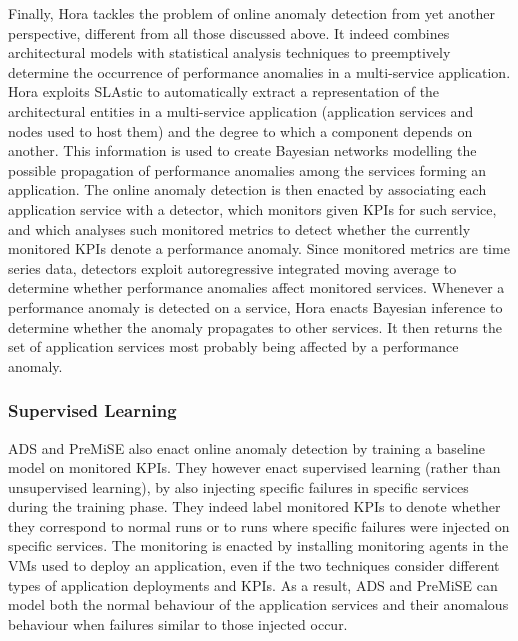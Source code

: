 Finally, Hora \cite{27_Pitakrat2018_HoraExtended,28_Pitakrat2016_Hora} tackles the problem of online anomaly detection from yet another perspective, different from all those discussed above.
It indeed combines architectural models with statistical analysis techniques to preemptively determine the occurrence of performance anomalies in a multi-service application. 
Hora exploits SLAstic \cite{vanHoorn2014_SLAstic} to automatically extract a representation of the architectural entities in a multi-service application (\viz application services and nodes used to host them) and the degree to which a component depends on another.
This information is used to create Bayesian networks \cite{Neal1996_BayesianNetwork} modelling the possible propagation of performance anomalies among the services forming an application.
The online anomaly detection is then enacted by associating each application service with a detector, which monitors given KPIs for such service, and which analyses such monitored metrics to detect whether the currently monitored KPIs denote a performance anomaly. 
Since monitored metrics are time series data, detectors exploit autoregressive integrated moving average \cite{Shumway2017_ARIMA} to determine whether performance anomalies affect monitored services. 
Whenever a performance anomaly is detected on a service, Hora \cite{27_Pitakrat2018_HoraExtended,28_Pitakrat2016_Hora} enacts Bayesian inference \cite{Neal1996_BayesianNetwork} to determine whether the anomaly propagates to other services. 
It then returns the set of application services most probably being affected by a performance anomaly.

\subsubsection{Supervised Learning}
ADS \cite{15_Du2018_AnomalyDetectionContainerMicroservices} and PreMiSE \cite{33_Mariani2020_PredictingFailures} also enact online anomaly detection by training a baseline model on monitored KPIs.
They however enact supervised learning (rather than unsupervised learning), by also injecting specific failures in specific services during the training phase.
They indeed label monitored KPIs to denote whether they correspond to normal runs or to runs where specific failures were injected on specific services.
The monitoring is enacted by installing monitoring agents in the VMs used to deploy an application, even if the two techniques consider different types of application deployments and KPIs.
As a result, ADS \cite{15_Du2018_AnomalyDetectionContainerMicroservices} and PreMiSE \cite{33_Mariani2020_PredictingFailures} can model both the normal behaviour of the application services and their anomalous behaviour when failures similar to those injected occur.


